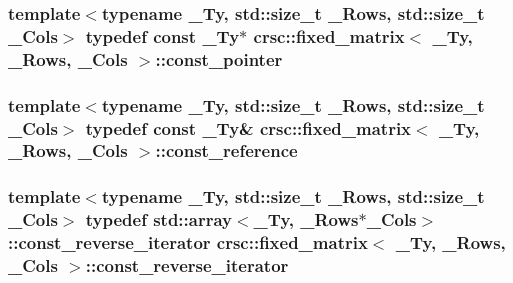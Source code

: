 \subsubsection[{\texorpdfstring{const\+\_\+pointer}{const_pointer}}]{\setlength{\rightskip}{0pt plus 5cm}template$<$typename \+\_\+\+Ty, std\+::size\+\_\+t \+\_\+\+Rows, std\+::size\+\_\+t \+\_\+\+Cols$>$ typedef const \+\_\+\+Ty$\ast$ {\bf crsc\+::fixed\+\_\+matrix}$<$ \+\_\+\+Ty, \+\_\+\+Rows, \+\_\+\+Cols $>$\+::{\bf const\+\_\+pointer}}\hypertarget{classcrsc_1_1fixed__matrix_a34598e630abde53cf355ea9aba5f1930}{}\label{classcrsc_1_1fixed__matrix_a34598e630abde53cf355ea9aba5f1930}
\subsubsection[{\texorpdfstring{const\+\_\+reference}{const_reference}}]{\setlength{\rightskip}{0pt plus 5cm}template$<$typename \+\_\+\+Ty, std\+::size\+\_\+t \+\_\+\+Rows, std\+::size\+\_\+t \+\_\+\+Cols$>$ typedef const \+\_\+\+Ty\& {\bf crsc\+::fixed\+\_\+matrix}$<$ \+\_\+\+Ty, \+\_\+\+Rows, \+\_\+\+Cols $>$\+::{\bf const\+\_\+reference}}\hypertarget{classcrsc_1_1fixed__matrix_ac96e937b9ecde6b2700b0865218276c4}{}\label{classcrsc_1_1fixed__matrix_ac96e937b9ecde6b2700b0865218276c4}
\subsubsection[{\texorpdfstring{const\+\_\+reverse\+\_\+iterator}{const_reverse_iterator}}]{\setlength{\rightskip}{0pt plus 5cm}template$<$typename \+\_\+\+Ty, std\+::size\+\_\+t \+\_\+\+Rows, std\+::size\+\_\+t \+\_\+\+Cols$>$ typedef std\+::array$<$\+\_\+\+Ty, \+\_\+\+Rows$\ast$\+\_\+\+Cols$>$\+::{\bf const\+\_\+reverse\+\_\+iterator} {\bf crsc\+::fixed\+\_\+matrix}$<$ \+\_\+\+Ty, \+\_\+\+Rows, \+\_\+\+Cols $>$\+::{\bf const\+\_\+reverse\+\_\+iterator}}\hypertarget{classcrsc_1_1fixed__matrix_a8af1c1c37f8a05a1ac04d4e8ec57a494}{}\label{classcrsc_1_1fixed__matrix_a8af1c1c37f8a05a1ac04d4e8ec57a494}
